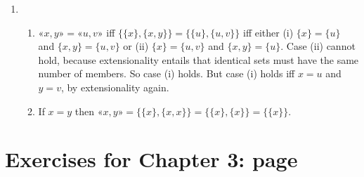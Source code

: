 {\begin{enumerate}
\begin{enumerate}
	\end{enumerate} \setcounter{enumi}{3}
	\item \begin{enumerate}
		\item $«x,y»= «u,v»$ iff $\{\{x\},\{x,y\}\} = \{\{u\},\{u,v\}\}$ iff either (i) $\{x\}=\{u\}$ and $\{x,y\}=\{u,v\}$ or (ii) $\{x\} = \{u,v\}$ and $\{x,y\} = \{u\}$. Case (ii) cannot hold, because extensionality entails that identical sets must have the same number of members. So case (i) holds. But case (i) holds iff $x=u$ and $y=v$, by extensionality again.
		\item If $x=y$ then $«x,y»=\{\{x\},\{x,x\}\}=\{\{x\},\{x\}\}=\{\{x\}\}$.
	\end{enumerate}
\end{enumerate}

\section*{Exercises for Chapter 3: page \pageref{ex3}} \label{ans3}




}